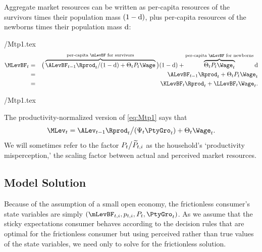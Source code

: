 \documentclass[titlepage]{\econtex}
\begin{document}
Aggregate market resources can be written as per-capita resources of the survivors times their population mass $(1-\mathrm{d})$, plus per-capita resources of the newborns times their population mass $\mathrm{d}$:
\begin{verbatimwrite}{\eq/Mtp1.tex}
\begin{eqnarray}
  \MLevBF_{t} & = & \big(\overbrace{\ALevBF_{t-1} {\Rprod}_t/\PLives  + \Theta_{t} {P}_{t}\Wage}^{\text{per-capita $\mLevBF$ for survivors}}\big)\PLives+\overbrace{\Theta_{t} {P}_{t}\Wage_t}^{\text{per-capita $\mLevBF$ for newborns}} \PDies \nonumber \\
                       & = & \ALevBF_{t-1} {\Rprod}_t + \Theta_{t} P_t \Wage_t  \label{eq:Mtp1} \\
                       & = & \KLevBF_t \Rprod_t + \LLevBF_t \Wage_t. \nonumber
\end{eqnarray}
\end{verbatimwrite}
 \eq/Mtp1.tex


The productivity-normalized version of \eqref{eq:Mtp1} says that
\begin{equation}\label{eq:Mtp1norm}
\MLev_t = \ALev_{t-1} \Rprod_t\big/(\Psi_t \PtyGro_t) + \Theta_t \Wage_t.
\end{equation}
We will sometimes refer to the factor $P_t\big/\widetilde{P}_{t,i}$ as the household's `productivity misperception,' the scaling factor between actual and perceived market resources.


\subsection{Model Solution}

Because of the assumption of a small open economy, the frictionless consumer's state variables are simply $(\mLevBF_{t,i},p_{t,i},P_t,\PtyGro_t)$.  As we assume that the sticky expectations consumer behaves according to the decision rules that are optimal for the frictionless consumer but using perceived rather than true values of the state variables, we need only to solve for the frictionless solution.
\end{document}

